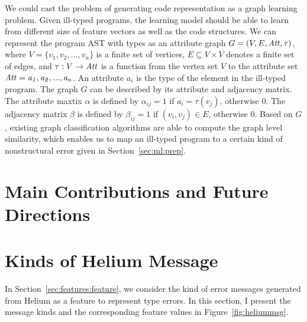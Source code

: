 \documentclass[12pt]{report}	%
\begin{document}
We could cast the problem of generating code representation as a graph learning problem.
Given ill-typed programs, the learning model should be able to learn from different size of feature vectors as well as the code structures.
%
We can represent the program AST with types as an attribute graph
$G = (V, E, \it{Att}, \tau)$,
where $V = \{v_1, v_2, ... , v_n\}$ is a finite set of vertices,
$E \subseteq V \times V$ denotes a finite set of edges,
and $\tau : V \to \it{Att}$ is a function from the vertex set $V$ to the attribute set $\it{Att = {a_1, a_2, ... , a_n}}$.
An attribute $a_i$ is the type of the element in the ill-typed program.
The graph $G$ can be described by its attribute and adjacency matrix. 
The attribute maxtix $\alpha$ is defined by $\alpha_{ij} = 1$ if $a_i  = \tau(v_j)$, otherwise 0.
The adjacency matrix $\beta$ is defined by $\beta_{ij} = 1$ if $(v_i, v_j) \in E$, otherwise 0.
Based on $G$, existing graph classification algorithms
\cite{nikolentzos2017matching,johansson2015learning,dai2016discriminative,niepert2016learning,mousavi2017hierarchical,guo2017combining}
are able to compute the graph level similarity, which enables us to map an ill-typed program to a certain kind of nonstructural error given in Section~\ref{sec:ml:prep}.



\section{Main Contributions and Future Directions}
\label{sec:conclusion:close}

%	

%	
%
%
%
\appendix

\section{Kinds of Helium Message}
\label{sec:msgkind}

In Section~\ref{sec:features:feature},
we consider the kind of error messages generated from Helium as a feature to represent type errors.
In this section, I present the message kinds and the corresponding feature values in Figure~\ref{fig:heliummsg}.
\end{document}

